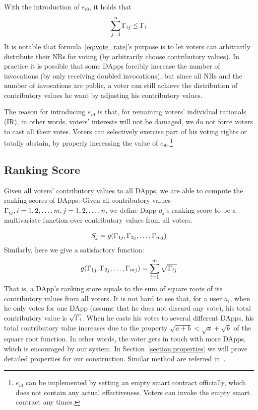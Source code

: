 With the introduction of $e_{i0}$, it holds that
$$\sum_{j=1}^n \Gamma_{ij} \leq \Gamma_i$$
\noindent It is notable that formula~\ref{eq:vote_rate}'s purpose is to let voters can arbitrarily distribute their NRs for voting (by arbitrarily choose contributory values). In practice it is possible that some DApps forcibly increase the number of invocations (by only receiving doubled invocations), but since all NRs and the number of invocations are public, a voter can still achieve the distribution of contributory values he want by adjusting his contributory values.

The reason for introducing $e_{i0}$ is that, for remaining voters' individual rationals (IR), in other words, voters' interests will not be damaged, we do not force voters to cast all their votes. Voters can selectively exercise part of his voting rights or totally abstain, by properly increasing the value of $e_{i0}$.\footnote{$e_{i0}$ can be implemented by setting an empty smart contract officially, which does not contain any actual effectiveness. Voters can invoke the empty smart contract any times.}
\subsection{Ranking Score}
\noindent Given all voters' contributory values to all DApps, we are able to compute the
ranking scores of DApps: Given all contributory values
$\Gamma_{ij},i=1,2,\ldots,m,j=1,2,\ldots,n$, we define Dapp $d_j$'s ranking score to be a multivariate function over contributory values from all voters:

\begin{align}
	S_j = g(\Gamma_{1j},\Gamma_{2j},\ldots,\Gamma_{mj})
\end{align}
Similarly, here we give a satisfactory function:
\begin{align}
	\label{eq:sqrt}
	g(\Gamma_{1j},\Gamma_{2j},\ldots,\Gamma_{mj}) = \sum_{i=1}^m \sqrt{\Gamma_{ij}}
\end{align}
That is, a DApp's ranking store equals to the sum of square roots of its contributory values from all voters. It is not hard to see that, for a user $a_i$, when he only votes for one DApp (assume that he does not discard any vote), his total contributory value is $\sqrt{\Gamma_i}$. When he casts his votes to several different DApps, his total contributory value increases due to the property $\sqrt{a+b}<\sqrt{a}+\sqrt{b}$ of the square root function. In other words, the voter gets in touch with more DApps, which is encouraged by our system. In Section~\ref{section:properties} we will prove  detailed properties for our construction. Similar method are referred in~\cite{buterin2018liberal}.


